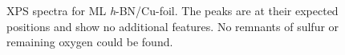 \begin{figure}[ht]
	\centering
	\caption{XPS spectra for ML \textit{h}-BN/Cu-foil. The peaks are at their expected positions\cite{kidambi_situ_2014} and show no additional features. No remnants of sulfur or remaining oxygen could be found.}
	\label{fig:xps-self-grown}
\end{figure}

